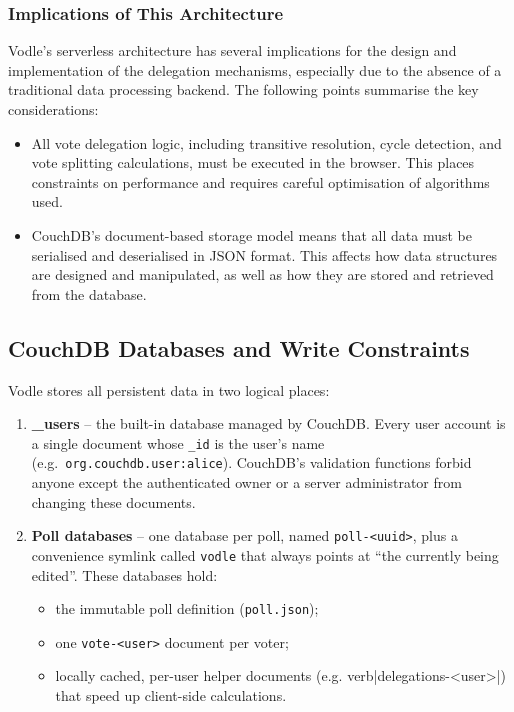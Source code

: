 \subsubsection{Implications of This Architecture}
Vodle's serverless architecture has several implications for the design and implementation of the delegation mechanisms, especially due to the absence of a traditional data processing backend. The following points summarise the key considerations:
\begin{itemize}
  \item All vote delegation logic, including transitive resolution, cycle detection, and vote splitting calculations, must be executed in the browser. This places constraints on performance and requires careful optimisation of algorithms used.
  \item CouchDB's document-based storage model means that all data must be serialised and deserialised in JSON format. This affects how data structures are designed and manipulated, as well as how they are stored and retrieved from the database.
\end{itemize}

%
%

\subsection{CouchDB Databases and Write Constraints}
\label{subsec:couchdb_limits}

Vodle stores all persistent data in two logical places:

\begin{enumerate}
  \item \textbf{\_users} -- the built-in database managed by CouchDB. Every user account is a single document whose \verb|_id| is the user's name (e.g.\ \verb|org.couchdb.user:alice|). CouchDB's validation functions forbid anyone except the authenticated owner or a server administrator from changing these documents.
  \item \textbf{Poll databases} -- one database per poll, named \verb|poll-<uuid>|, plus a convenience symlink called \verb|vodle| that always points at ``the currently being edited''. These databases hold:
        \begin{itemize}
          \item the immutable poll definition (\verb|poll.json|);
          \item one \verb|vote-<user>| document per voter;
          \item locally cached, per-user helper documents (e.g. verb|delegations-<user>|) that speed up client-side calculations.
        \end{itemize}
\end{enumerate}

